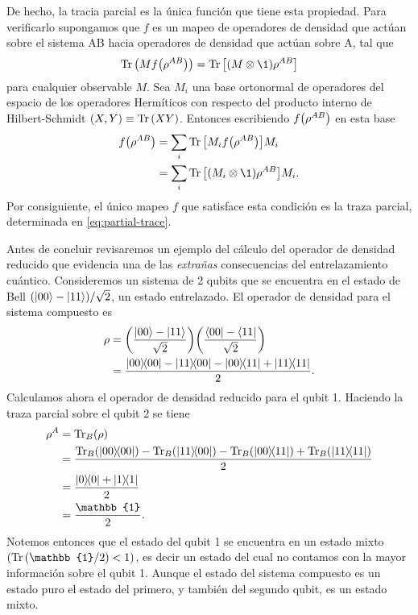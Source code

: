 De hecho, la tracia parcial es la única función que tiene esta propiedad.
Para verificarlo supongamos que $f$ es un mapeo de operadores de 
densidad que actúan sobre el sistema AB hacia operadores de densidad 
que actúan sobre A, tal que 
\begin{align}
	\Tr \qty(Mf\qty(\rho^{AB})) = \Tr \qty[\qty(M\ten \1)\rho^{AB}]
\end{align}
para cualquier observable $M$. Sea $M_i$ una base ortonormal de operadores
del espacio de los operadores Hermíticos con respecto del producto interno
de Hilbert-Schmidt $\qty(X,Y)\equiv \Tr\qty(XY)$. Entonces escribiendo
$f\qty(\rho ^{AB})$ en esta base
\begin{align}
	f\qty(\rho^{AB}) 
	&= \sum_i \Tr\qty[M_if\qty(\rho^{AB})]M_i \\
	&= \sum_i \Tr\qty[\qty(M_i\ten \1)\rho^{AB}]M_i.
\end{align}
Por consiguiente, el único mapeo $f$ que satisface esta condición
es la traza parcial, determinada en \eqref{eq:partial-trace}.

Antes de concluir revisaremos un ejemplo del cálculo del 
operador de densidad reducido que evidencia una de las
\textit{extrañas} consecuencias del
entrelazamiento cuántico.
Consideremos un sistema de 2 qubits que se encuentra en el estado de Bell
$\qty(\ket{00}-\ket{11})/\sqrt{2}$, un estado entrelazado. El operador
de densidad para el sistema compuesto es
\begin{align}
	\rho &= \qty(\frac{\ket{00}-\ket{11}}{\sqrt{2}})
	\qty(\frac{\bra{00}-\bra{11}}{\sqrt{2}}) \\
			 &= \frac{\dyad{00}{00}-\dyad{11}{00}-\dyad{00}{11}+\dyad{11}{11}}{2}.
\end{align}
Calculamos ahora el operador de densidad reducido para el qubit 1.  
Haciendo la traza parcial sobre el qubit 2 se tiene
\begin{align}
	\rho^A &= \Tr _B(\rho) \\
			 	 &= \frac{\Tr _B(\dyad{00}{00})-\Tr _B(\dyad{11}{00})
			 	 -\Tr _B(\dyad{00}{11})+\Tr _B(\dyad{11}{11})}{2} \\
			 	 &= \frac{\dyad{0}{0} + \dyad{1}{1}}{2} \\
			 	 &= \frac{\mathbb{1}}{2}.
\end{align}
Notemos entonces que el estado del qubit 1 se encuentra en un estado mixto
$\qty(\Tr \qty(\mathbb{1}/2)<1)$, 
es decir un estado del cual no contamos con la mayor información 
sobre el qubit 1. 
Aunque el estado del sistema compuesto es un estado puro el estado
del primero, y también del segundo qubit, es un estado mixto. 

